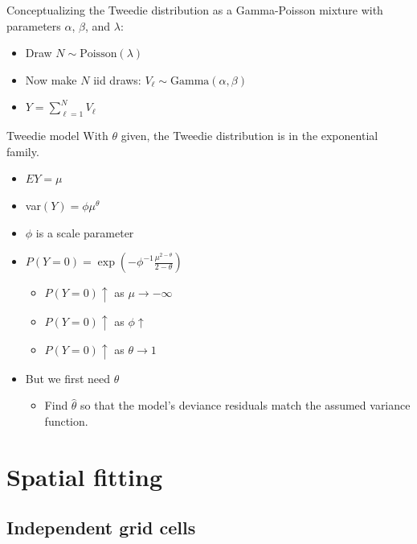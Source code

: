 \documentclass{beamer}
\begin{document}
\begin{frame}
  Conceptualizing the Tweedie distribution as a Gamma-Poisson mixture with parameters $\alpha$, $\beta$, and $\lambda$:\\
  \begin{itemize}
    \item Draw $N \sim \text{Poisson}(\lambda)$
    \item Now make $N$ iid draws: $V_{\ell} \sim \text{Gamma}(\alpha, \beta)$
    \item $Y = \sum\limits_{\ell=1}^N  V_{\ell}$
  \end{itemize}
\end{frame}


\begin{frame}[fragile]{Tweedie model}
  With $\theta$ given, the Tweedie distribution is in the exponential family.\\
  \begin{itemize}
    \item $EY = \mu$
    \item var$(Y) = \phi \mu^\theta$
    \item $\phi$ is a scale parameter
    \item $P(Y=0) = \exp{\left(-\phi^{-1} \frac{\mu^{2-\theta}}{2-\theta}\right)}$
    \begin{itemize}
      \item $P(Y=0) \uparrow$ as $\mu \rightarrow -\infty$
      \item $P(Y=0) \uparrow$ as $\phi \uparrow$
      \item $P(Y=0) \uparrow$ as $\theta \rightarrow 1$
    \end{itemize}
    \item But we first need $\theta$
    \begin{itemize}
      \item Find $\hat{\theta}$ so that the model's deviance residuals match the assumed variance function. 
    \end{itemize}
  \end{itemize}
\end{frame}


\section{Spatial fitting}

\subsection{Independent grid cells}
\end{document}

